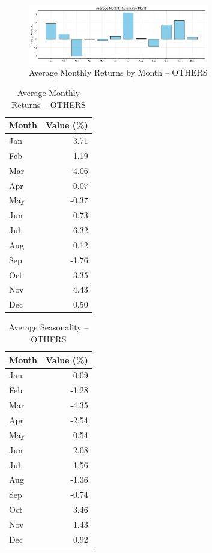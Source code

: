 \documentclass[12pt]{article}
\begin{document}
\begin{figure}[h!]
    \centering
    \includegraphics[width=0.7\textwidth]{decomposition_outputs/OTHERS_avg_monthly_returns.png}
    \caption{Average Monthly Returns by Month -- OTHERS}
\end{figure}

\begin{table}[h!]
\centering
\caption{Average Monthly Returns -- OTHERS}
\begin{tabular}{l r}
\toprule
Month & Value (\%) \\
\midrule
Jan & 3.71 \\
Feb & 1.19 \\
Mar & -4.06 \\
Apr & 0.07 \\
May & -0.37 \\
Jun & 0.73 \\
Jul & 6.32 \\
Aug & 0.12 \\
Sep & -1.76 \\
Oct & 3.35 \\
Nov & 4.43 \\
Dec & 0.50 \\
\bottomrule
\end{tabular}
\end{table}

\begin{table}[h!]
\centering
\caption{Average Seasonality -- OTHERS}
\begin{tabular}{l r}
\toprule
Month & Value (\%) \\
\midrule
Jan & 0.09 \\
Feb & -1.28 \\
Mar & -4.35 \\
Apr & -2.54 \\
May & 0.54 \\
Jun & 2.08 \\
Jul & 1.56 \\
Aug & -1.36 \\
Sep & -0.74 \\
Oct & 3.46 \\
Nov & 1.43 \\
Dec & 0.92 \\
\bottomrule
\end{tabular}
\end{table}
\end{document}
